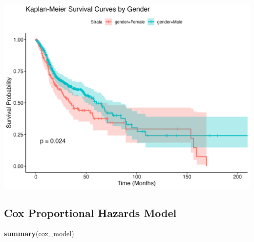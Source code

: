 \documentclass[
  11pt,
]{article}
\newenvironment{Shaded}{\begin{snugshade}}{\end{snugshade}}
\newcommand{\FunctionTok}[1]{\textcolor[rgb]{0.13,0.29,0.53}{\textbf{#1}}}
\newcommand{\NormalTok}[1]{#1}
\begin{document}
\includegraphics[width=0.8\linewidth]{../outputs/plots/survival/km_survival_by_gender}

\subsection{Cox Proportional Hazards
Model}\label{cox-proportional-hazards-model}

\begin{Shaded}
\begin{Highlighting}[]
\FunctionTok{summary}\NormalTok{(cox\_model)}
\end{Highlighting}
\end{Shaded}
\end{document}
